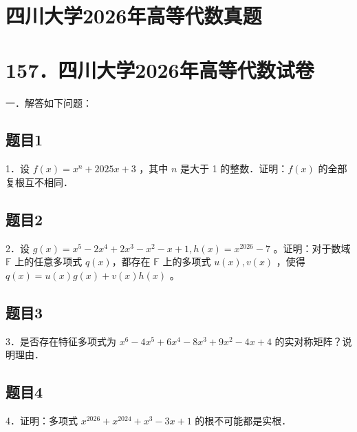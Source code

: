 \documentclass{article}
\begin{document}
\section*{四川大学2026年高等代数真题}
\section*{157．四川大学2026年高等代数试卷}
一．解答如下问题：\\

\subsection{题目1}
1．设 \(f(x)=x^{n}+2025 x+3\) ，其中 \(n\) 是大于 1 的整数．证明：\(f(x)\) 的全部复根互不相同．

\subsection{题目2}
2．设 \(g(x)=x^{5}-2 x^{4}+2 x^{3}-x^{2}-x+1, h(x)=x^{2026}-7\) 。证明：对于数域 \(\mathbb{F}\) 上的任意多项式 \(q(x)\)，都存在 \(\mathbb{F}\) 上的多项式 \(u(x), v(x)\) ，使得 \(q(x)=u(x) g(x)+v(x) h(x)\) 。

\subsection{题目3}
3．是否存在特征多项式为 \(x^{6}-4 x^{5}+6 x^{4}-8 x^{3}+9 x^{2}-4 x+4\) 的实对称矩阵？说明理由．

\subsection{题目4}
4．证明：多项式 \(x^{2026}+x^{2024}+x^{3}-3 x+1\) 的根不可能都是实根．
\end{document}
